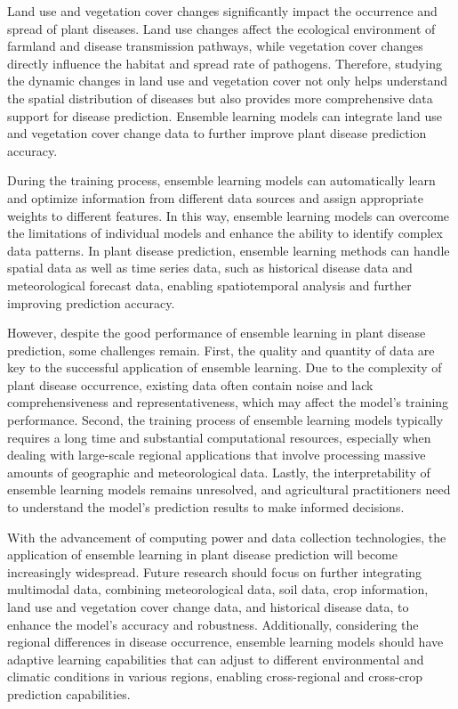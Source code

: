 \documentclass[AutoFakeBold]{LZUThesis-PgD&PhD}
\begin{document}
{		Land use and vegetation cover changes significantly impact the occurrence and spread of plant diseases. Land use changes affect the ecological environment of farmland and disease transmission pathways, while vegetation cover changes directly influence the habitat and spread rate of pathogens. Therefore, studying the dynamic changes in land use and vegetation cover not only helps understand the spatial distribution of diseases but also provides more comprehensive data support for disease prediction. Ensemble learning models can integrate land use and vegetation cover change data to further improve plant disease prediction accuracy.
		
		During the training process, ensemble learning models can automatically learn and optimize information from different data sources and assign appropriate weights to different features. In this way, ensemble learning models can overcome the limitations of individual models and enhance the ability to identify complex data patterns. In plant disease prediction, ensemble learning methods can handle spatial data as well as time series data, such as historical disease data and meteorological forecast data, enabling spatiotemporal analysis and further improving prediction accuracy.
		
		However, despite the good performance of ensemble learning in plant disease prediction, some challenges remain. First, the quality and quantity of data are key to the successful application of ensemble learning. Due to the complexity of plant disease occurrence, existing data often contain noise and lack comprehensiveness and representativeness, which may affect the model's training performance. Second, the training process of ensemble learning models typically requires a long time and substantial computational resources, especially when dealing with large-scale regional applications that involve processing massive amounts of geographic and meteorological data. Lastly, the interpretability of ensemble learning models remains unresolved, and agricultural practitioners need to understand the model's prediction results to make informed decisions.
		
		With the advancement of computing power and data collection technologies, the application of ensemble learning in plant disease prediction will become increasingly widespread. Future research should focus on further integrating multimodal data, combining meteorological data, soil data, crop information, land use and vegetation cover change data, and historical disease data, to enhance the model's accuracy and robustness. Additionally, considering the regional differences in disease occurrence, ensemble learning models should have adaptive learning capabilities that can adjust to different environmental and climatic conditions in various regions, enabling cross-regional and cross-crop prediction capabilities.
		
}
\end{document}
